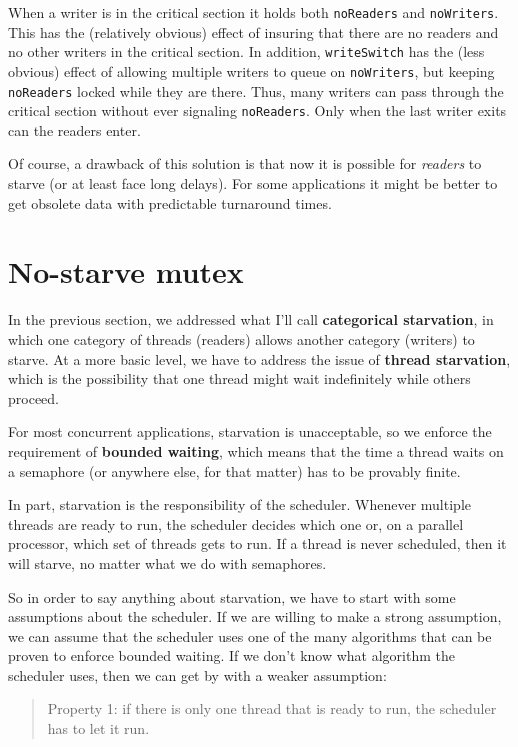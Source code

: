 \documentclass{book}
\newcommand{\clearemptydoublepage}{\newpage\cleardoublepage}
\begin{document}
When a writer is in the critical section it holds both
{\tt noReaders} and {\tt noWriters}.  This has the
(relatively obvious) effect of insuring that there are
no readers and no other writers in the critical section.
In addition, {\tt writeSwitch} has the (less obvious) effect of
allowing multiple writers to queue on {\tt noWriters},
but keeping {\tt noReaders} locked while they are
there.  Thus, many writers can pass through the critical
section without ever signaling
{\tt noReaders}.  Only when the last writer exits can
the readers enter.

Of course, a drawback of this solution is that now it is
possible for {\em readers} to starve (or at least face long
delays).  For some applications it might be better to get
obsolete data with predictable turnaround times.



\clearemptydoublepage
\section{No-starve mutex}
\label{props}

In the previous section, we addressed what I'll call
{\bf categorical starvation}, in which one category of threads
(readers) allows another category (writers) to starve.
At a more basic level, we have to address the issue of
{\bf thread starvation}, which is the possibility that one
thread might wait indefinitely while others proceed.

For most concurrent applications, starvation is unacceptable,
so we enforce the requirement of {\bf bounded waiting}, which
means that the time a thread waits on a semaphore (or anywhere
else, for that matter) has to be provably finite.

In part, starvation is the responsibility of the scheduler.
Whenever multiple threads are ready to run, the scheduler decides
which one or, on a parallel processor, which set of threads gets
to run.  If a thread is never scheduled, then it will starve,
no matter what we do with semaphores.

So in order to say anything about starvation, we have to start
with some assumptions about the scheduler.  If we are willing
to make a strong assumption, we can assume that the scheduler
uses one of the many algorithms that can be proven to enforce
bounded waiting.  If we don't know what algorithm the scheduler
uses, then we can get by with a weaker assumption:

\begin{quote}
Property 1: if there is only one thread that is ready to
run, the scheduler has to let it run.
\end{quote}
\end{document}
